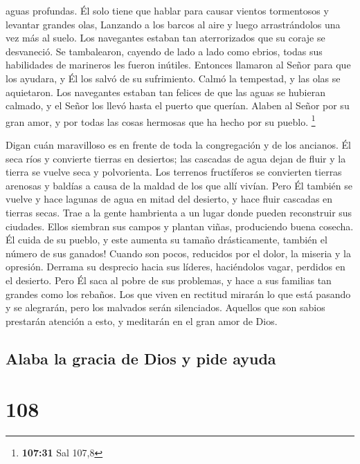 aguas profundas.  Él solo tiene que hablar para causar
vientos tormentosos y levantar grandes olas,  Lanzando a
los barcos al aire y luego arrastrándolos una vez más al suelo. Los
navegantes estaban tan aterrorizados que su coraje se desvaneció.
 Se tambalearon, cayendo de lado a lado como ebrios,
todas sus habilidades de marineros les fueron inútiles. 
Entonces llamaron al Señor para que los ayudara, y Él los salvó de su
sufrimiento.  Calmó la tempestad, y las olas se
aquietaron.  Los navegantes estaban tan felices de que
las aguas se hubieran calmado, y el Señor los llevó hasta el puerto que
querían.  Alaben al Señor por su gran amor, y por todas
las cosas hermosas que ha hecho por su pueblo. \footnote{\textbf{107:31}
  Sal 107,8}

 Digan cuán maravilloso es en frente de toda la
congregación y de los ancianos.  Él seca ríos y convierte
tierras en desiertos; las cascadas de agua dejan de fluir y la tierra se
vuelve seca y polvorienta.  Los terrenos fructíferos se
convierten tierras arenosas y baldías a causa de la maldad de los que
allí vivían.  Pero Él también se vuelve y hace lagunas de
agua en mitad del desierto, y hace fluir cascadas en tierras secas.
 Trae a la gente hambrienta a un lugar donde pueden
reconstruir sus ciudades.  Ellos siembran sus campos y
plantan viñas, produciendo buena cosecha.  Él cuida de su
pueblo, y este aumenta su tamaño drásticamente, también el número de sus
ganados!  Cuando son pocos, reducidos por el dolor, la
miseria y la opresión.  Derrama su desprecio hacia sus
líderes, haciéndolos vagar, perdidos en el desierto. 
Pero Él saca al pobre de sus problemas, y hace a sus familias tan
grandes como los rebaños.  Los que viven en rectitud
mirarán lo que está pasando y se alegrarán, pero los malvados serán
silenciados.  Aquellos que son sabios prestarán atención
a esto, y meditarán en el gran amor de Dios.

\hypertarget{alaba-la-gracia-de-dios-y-pide-ayuda}{%
\subsection{Alaba la gracia de Dios y pide
ayuda}\label{alaba-la-gracia-de-dios-y-pide-ayuda}}

\hypertarget{section-107}{%
\section{108}\label{section-107}}

